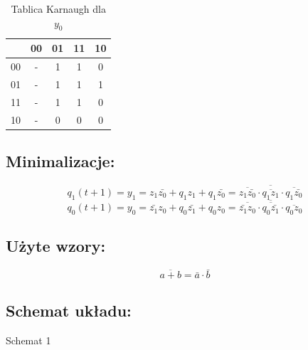 \documentclass[12pt,a4paper]{article}
\begin{document}
\begin{table}[H]
\begin{minipage}{.5\textwidth}
				\caption{Tablica Karnaugh dla $y_0$}
				\vspace{0.2cm}
				\centering
				\begin{tabular}{c|c|c|c|c}
					\backslashbox{$z_1z_0$}{$q_1q_0$}&00&01&11&10\\\hline
					00	&	-	&	1	&	1	&	0	\\\hline
					01	&	-	&	1	&	1	&	1	\\\hline
					11	&	-	&	1	&	1	&	0	\\\hline
					10	&	-	&	0	&	0	&	0	
				\end{tabular}
			\end{minipage}
			\end{table}
		
		\subsection{Minimalizacje:}
			\begin{displaymath}
			q_1(t+1) = y_1 = z_1\bar{z_0} + q_1z_1 + q_1\bar{z_0}= \overline{\overline{z_1\bar{z_0}} \cdot \overline{q_1z_1} \cdot \overline{q_1\bar{z_0}}}
			\end{displaymath}
			\begin{displaymath}
			q_0(t+1) = y_0 = \bar{z_1}z_0 + q_0\bar{z_1} + q_0z_0= \overline{\overline{\bar{z_1}z_0} \cdot \overline{q_0\bar{z_1}} \cdot \overline{q_0z_0}}
			\end{displaymath}
		
		\subsection{Użyte wzory:}
			\begin{equation}
			\overline{a+b}=\bar{a}\cdot\bar{b}
			\end{equation}
		
		\subsection{Schemat układu:}
		
		\vspace{1.5cm}
		\begin{center}
			Schemat 1
		\end{center}
\end{document}
